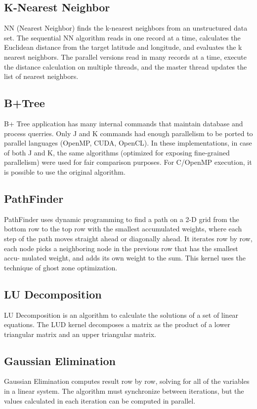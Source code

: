 \documentclass[paper=a4, fontsize=11pt]{scrartcl}
\numberwithin{equation}{section}		%
\numberwithin{figure}{section}			%
\numberwithin{table}{section}				%
\begin{document}
\subsection{K-Nearest Neighbor}
NN (Nearest Neighbor) finds the k-nearest neighbors from an unstructured data set. The sequential NN algorithm reads in one record at a time, calculates the Euclidean distance from the target latitude and longitude, and evaluates the k nearest neighbors. The parallel versions read in many records at a time, execute the distance calculation on multiple threads, and the master thread updates the list of nearest neighbors.

\subsection{B+Tree}
B+ Tree application has many internal commands that maintain database and process querries. Only J and K commands had enough parallelism to be ported to parallel languages (OpenMP, CUDA, OpenCL). In these implementations, in case of both J and K, the same algorithms (optimized for exposing fine-grained parallelism) were used for fair comparison purposes. For C/OpenMP execution, it is possible to use the original algorithm.

\subsection{PathFinder}
PathFinder uses dynamic programming to find a path on a 2-D grid from the bottom row to the top row with the smallest accumulated weights, where each step of the path moves straight ahead or diagonally ahead. It iterates row by row, each node picks a neighboring node in the previous row that has the smallest accu- mulated weight, and adds its own weight to the sum.
This kernel uses the technique of ghost zone optimization.

\subsection{LU Decomposition}
LU Decomposition is an algorithm to calculate the solutions of a set of linear equations. The LUD kernel decomposes a matrix as the product of a lower triangular matrix and an upper triangular matrix.

\subsection{Gaussian Elimination}
Gaussian Elimination computes result row by row, solving for all of the variables in a linear system. The algorithm must synchronize between iterations, but the values calculated in each iteration can be computed in parallel.
\end{document}
